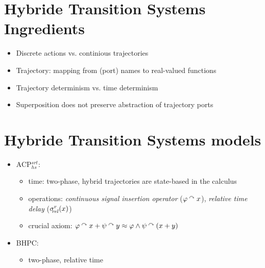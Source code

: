 \begin{slide}
\newslide\section*{Hybride Transition Systems Ingredients}
\begin{itemize}
\item Discrete actions vs. continious trajectories
\item Trajectory: mapping from (port) names to real-valued functions
\pause
\item Trajectory determinism vs. time determinism
  \begin{center}
  
  \end{center}
\item Superposition does not preserve abstraction of trajectory ports
\end{itemize}
\newslide\section*{Hybride Transition Systems models}
\begin{itemize}
\item ACP$^{srt}_{hs}$:
  \begin{itemize}
  \item time: two-phase, hybrid trajectories are state-based in the calculus
  \item operations: \emph{continuous signal insertion operator} ($\varphi\mathbin{\mathop{^\curvearrowright}} x$),
    \emph{relative time delay} ($\mathop{\sigma_{\!\!\mathit{rel}}^{r}}(x)$)
  \item crucial axiom: $\varphi\mathbin{\mathop{^\curvearrowright}} x+\psi\mathbin{\mathop{^\curvearrowright}} y\approx \varphi\wedge\psi\mathbin{\mathop{^\curvearrowright}}(x+y)$
  \end{itemize}
\pause
\item BHPC:
  \begin{itemize}
  \item two-phase, relative time

\end{itemize}
\end{itemize}
\end{slide}
